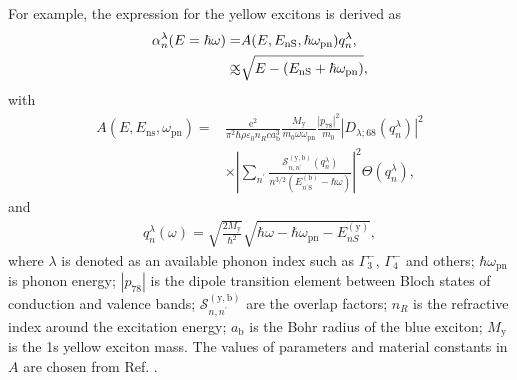 \documentclass[aps,reprint,amsmath,amssymb,prb]{revtex4-1}
\def\approxprop{%
  \def\p{%
    \setbox0=\vbox{\hbox{$\propto$}}%
    \ht0=0.6ex \box0 }%
  \def\s{%
    \vbox{\hbox{$\sim$}}%
  }%
  \mathrel{\raisebox{0.7ex}{%
      \mbox{$\underset{\s}{\p}$}%
    }}%
}
\begin{document}
For example, the expression for the yellow excitons is derived as
\begin{equation}
\begin{split}
\alpha_{n}^{\lambda}(E=\hbar\omega)=&A(E,E_{\text{nS}},\hbar\omega_{\text{pn}})q_{n}^{\lambda},\\
\approxprop&  \sqrt{E-(E_\text{nS}+\hbar\omega_{\text{pn}})},
\end{split}
\end{equation}
with
\begin{equation*}
\begin{aligned}
A(E,E_{\text{ns}},\omega_{\text{pn}} )=&
 \frac{\mathrm{e}^{2}}{\pi^{2} \hbar \rho \varepsilon_{0} n_{R} c a_{\mathrm{b}}^{3}} \frac{M_{\mathrm{y}}}{m_{0}\omega \omega_{\text{pn}}} \frac{\left|p_{78}\right|^{2}}{m_{0}}\left|D_{\lambda ; 68}\left(q_{n}^{\lambda}\right)\right|^{2}\\
 & \times\left|\sum_{n^{\prime}} \frac{\mathcal{S}_{n, n^{\prime}}^{(\mathrm{y}, \mathrm{b})}\left(q_{n}^{\lambda}\right)}{n^{3 / 2}\left(E_{n^{\prime} \mathrm{S}}^{(\mathrm{b})}-\hbar \omega\right)}\right|^{2} \Theta\left(q_{n}^{\lambda}\right), 
\end{aligned}
\end{equation*}
and
\begin{equation*}
\begin{aligned}
q_{n}^{\lambda}(\omega)=\sqrt{\frac{2 M_{\mathrm{y}}}{\hbar^{2}}} \sqrt{\hbar \omega-\hbar \omega_{\text{pn}}-E_{n S}^{(\mathrm{y})}},
\end{aligned}
\end{equation*}
where $\lambda$ is denoted as an available phonon index such as  ${\Gamma}_3^{-}$, ${\Gamma}_4^{-}$ and others; $\hbar\omega_{\text{pn}}$ is phonon energy; $\left|p_{78}\right|$ is the dipole transition element between Bloch states of conduction and valence bands; $\mathcal{S}_{n, n^{\prime}}^{(\mathrm{y}, \mathrm{b})}$ are the overlap factors; $n_{R}$ is the refractive index around the excitation energy; $a_{\mathrm{b}}$ is the Bohr radius of the blue exciton; $M_{\mathrm{y}}$ is the 1s yellow exciton mass.
The values of parameters and material constants in $A$ are chosen from Ref. \cite{Schone2017}.
\end{document}
